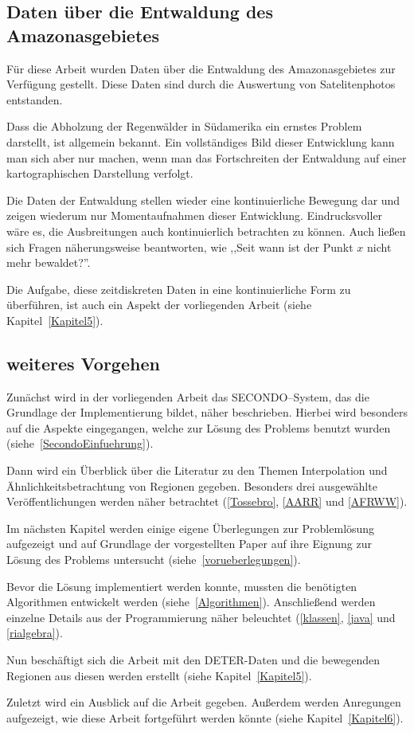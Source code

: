 \subsection*{Daten über die Entwaldung des Amazonasgebietes}

Für diese Arbeit wurden Daten über die Entwaldung des Amazonasgebietes zur Verfügung gestellt.
Diese Daten sind durch die Auswertung von Satelitenphotos entstanden. 

Dass die Abholzung der Regenwälder in Südamerika ein ernstes Problem darstellt, ist allgemein bekannt. Ein vollständiges Bild dieser Entwicklung kann man sich aber nur machen, wenn man das Fortschreiten der Entwaldung auf einer kartographischen Darstellung verfolgt. 

Die Daten der Entwaldung stellen wieder eine kontinuierliche Bewegung dar und zeigen wiederum nur Momentaufnahmen dieser Entwicklung. Eindrucksvoller wäre es, die Ausbreitungen auch kontinuierlich betrachten zu können. Auch ließen sich Fragen näherungsweise beantworten, wie ,,Seit wann ist der Punkt $x$ nicht mehr bewaldet?''.

Die Aufgabe, diese zeitdiskreten Daten in eine kontinuierliche Form zu überführen, ist auch ein Aspekt der vorliegenden Arbeit (siehe Kapitel~\vref{Kapitel5}).




\subsection*{weiteres Vorgehen}

Zunächst wird in der vorliegenden Arbeit das SECONDO--System, das die Grundlage der Implementierung bildet, näher  beschrieben. Hierbei wird besonders auf die Aspekte eingegangen, welche zur Lösung des Problems benutzt wurden (siehe~\vref{SecondoEinfuehrung}).

Dann wird ein Überblick über die Literatur zu den Themen Interpolation und Ähnlichkeitsbetrachtung von Regionen gegeben. Besonders drei ausgewählte Veröffentlichungen werden näher betrachtet (\vref{Tossebro}, \vref{AARR} und \vref{AFRWW}).

Im nächsten Kapitel werden einige eigene Überlegungen zur Problemlösung aufgezeigt und auf Grundlage der vorgestellten Paper auf ihre Eignung zur Lösung des Problems untersucht (siehe~\vref{vorueberlegungen}).
 
Bevor die Lösung implementiert werden konnte, mussten die benötigten Algorithmen entwickelt werden (siehe~\vref{Algorithmen}). Anschließend werden einzelne Details aus der Programmierung näher beleuchtet (\vref{klassen}, \vref{java} und \vref{rialgebra}).


Nun beschäftigt sich die Arbeit mit den DETER-Daten und die bewegenden Regionen aus diesen werden erstellt (siehe Kapitel~\vref{Kapitel5}).

Zuletzt wird ein Ausblick auf die Arbeit gegeben. Außerdem werden Anregungen aufgezeigt, wie diese Arbeit fortgeführt werden könnte (siehe Kapitel~\vref{Kapitel6}).

